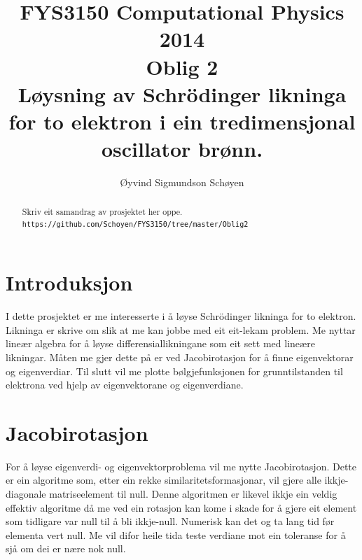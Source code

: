 \documentclass[11pt, a4paper]{article}
\begin{document}
\begin{titlepage}

  \title{\normalsize FYS3150 Computational Physics 2014\\
  \vspace{10mm}
  \huge Oblig 2\\
  \vspace{10mm}
  \normalsize {\bf Løysning av Schrödinger likninga for to elektron i ein tredimensjonal oscillator brønn.}}

  \author{Øyvind Sigmundson Schøyen}

\end{titlepage}

\maketitle

\newpage
\begin{abstract}
  Skriv eit samandrag av prosjektet her oppe. \\
  \texttt{https://github.com/Schoyen/FYS3150/tree/master/Oblig2}
\end{abstract}

\newpage
  \tableofcontents
\newpage

\section{Introduksjon}
  I dette prosjektet er me interesserte i å løyse Schrödinger likninga for to elektron. Likninga er skrive om slik at me kan jobbe med eit eit-lekam problem.
  Me nyttar lineær algebra for å løyse differensiallikningane som eit sett med lineære likningar. Måten me gjer dette på er ved Jacobirotasjon 
  for å finne eigenvektorar og eigenverdiar. Til slutt vil me plotte bølgjefunksjonen for grunntilstanden til elektrona ved hjelp av eigenvektorane og 
  eigenverdiane.


\section{Jacobirotasjon}
  For å løyse eigenverdi- og eigenvektorproblema vil me nytte Jacobirotasjon. Dette er ein algoritme som, etter ein rekke similaritetsformasjonar, vil 
  gjere alle ikkje-diagonale matriseelement til null. Denne algoritmen er likevel ikkje ein veldig effektiv algoritme då me ved ein rotasjon kan kome 
  i skade for å gjere eit element som tidligare var null til å bli ikkje-null. Numerisk kan det og ta lang tid før elementa vert null. Me vil difor heile 
  tida teste verdiane mot ein toleranse for å sjå om dei er nære nok null.
\end{document}
